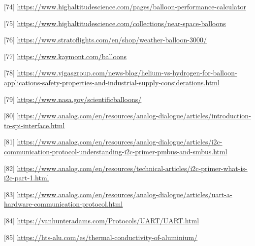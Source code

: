 \documentclass[12pt,a4paper]{article}
\begin{document}
{[}74{]} \href{https://www.highaltitudescience.com/pages/balloon-performance-calculator}{\ul{https://www.highaltitudescience.com/pages/balloon-performance-calculator}}

{[}75{]} \href{https://www.highaltitudescience.com/collections/near-space-balloons}{\ul{https://www.highaltitudescience.com/collections/near-space-balloons}}

{[}76{]} \href{https://www.stratoflights.com/en/shop/weather-balloon-3000/}{\ul{https://www.stratoflights.com/en/shop/weather-balloon-3000/}}

{[}77{]} \href{https://www.kaymont.com/balloons}{\ul{https://www.kaymont.com/balloons}}

{[}78{]} \href{https://www.yigasgroup.com/news-blog/helium-vs-hydrogen-for-balloon-applications-safety-properties-and-industrial-supply-considerations.html}{\ul{https://www.yigasgroup.com/news-blog/helium-vs-hydrogen-for-balloon-applications-safety-properties-and-industrial-supply-considerations.html}}

{[}79{]} \href{https://www.nasa.gov/scientificballoons/}{\ul{https://www.nasa.gov/scientificballoons/}}

{[}80{]} \href{https://www.analog.com/en/resources/analog-dialogue/articles/introduction-to-spi-interface.html}{\ul{https://www.analog.com/en/resources/analog-dialogue/articles/introduction-to-spi-interface.html}}

{[}81{]} \href{https://www.analog.com/en/resources/analog-dialogue/articles/i2c-communication-protocol-understanding-i2c-primer-pmbus-and-smbus.html}{\ul{https://www.analog.com/en/resources/analog-dialogue/articles/i2c-communication-protocol-understanding-i2c-primer-pmbus-and-smbus.html}}

{[}82{]} \href{https://www.analog.com/en/resources/technical-articles/i2c-primer-what-is-i2c-part-1.html}{\ul{https://www.analog.com/en/resources/technical-articles/i2c-primer-what-is-i2c-part-1.html}}

{[}83{]} \href{https://www.analog.com/en/resources/analog-dialogue/articles/uart-a-hardware-communication-protocol.html}{\ul{https://www.analog.com/en/resources/analog-dialogue/articles/uart-a-hardware-communication-protocol.html}}

{[}84{]} \href{https://vanhunteradams.com/Protocols/UART/UART.html}{\ul{https://vanhunteradams.com/Protocols/UART/UART.html}}

{[}85{]} \href{https://hts-alu.com/es/thermal-conductivity-of-aluminium/}{\ul{https://hts-alu.com/es/thermal-conductivity-of-aluminium/}}
\end{document}
